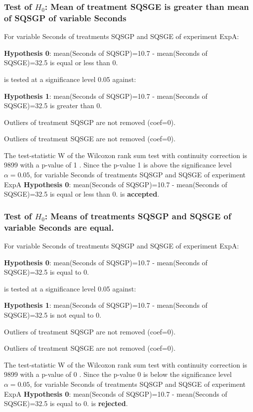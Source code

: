 \documentclass[18pt,c]{beamer}
\begin{document}
\begin{frame}[t]
 \frametitle{Test of $H_{0}$: Mean of treatment SQSGE is greater than mean of SQSGP of variable Seconds }
 \scriptsize
 For variable Seconds of treatments SQSGP and SQSGE of experiment ExpA:

\vspace{1mm}
{\bf Hypothesis 0}: mean(Seconds of SQSGP)=10.7 - mean(Seconds of SQSGE)=32.5 is equal or less than 0.


 \begin{center} is tested at a significance level 0.05 against: \end{center}

{\bf Hypothesis 1}: mean(Seconds of SQSGP)=10.7 - mean(Seconds of SQSGE)=32.5 is greater than 0.
\vspace{1mm}
\vspace{1mm}

 Outliers of treatment SQSGP  are not removed (coef=0).

 Outliers of treatment SQSGE  are not removed (coef=0).
\vspace{1mm}
 
 The test-statistic W of the Wilcoxon rank sum test with continuity correction is 9899 with a p-value of 1 .
 Since the p-value 1 is above the significance level $\alpha= 0.05 $,
 for variable Seconds of treatments SQSGP and SQSGE of experiment ExpA 
 {\bf Hypothesis 0}: mean(Seconds of SQSGP)=10.7 - mean(Seconds of SQSGE)=32.5 is equal or less than 0.
is {\bf accepted}.

 \end{frame}
\begin{frame}[t]
 \frametitle{Test of $H_{0}$: Means of treatments SQSGP and SQSGE of variable Seconds are equal. }
 \scriptsize
 For variable Seconds of treatments SQSGP and SQSGE of experiment ExpA:

\vspace{1mm}
{\bf Hypothesis 0}: mean(Seconds of SQSGP)=10.7 - mean(Seconds of SQSGE)=32.5 is equal to 0.


 \begin{center} is tested at a significance level 0.05 against: \end{center}

{\bf Hypothesis 1}: mean(Seconds of SQSGP)=10.7 - mean(Seconds of SQSGE)=32.5 is not equal to 0.
\vspace{1mm}
\vspace{1mm}

 Outliers of treatment SQSGP  are not removed (coef=0).

 Outliers of treatment SQSGE  are not removed (coef=0).
\vspace{1mm}
 
 The test-statistic W of the Wilcoxon rank sum test with continuity correction is 9899 with a p-value of 0 .
 Since the p-value 0 is below the significance level $\alpha= 0.05 $,
 for variable Seconds of treatments SQSGP and SQSGE of experiment ExpA 
 {\bf Hypothesis 0}: mean(Seconds of SQSGP)=10.7 - mean(Seconds of SQSGE)=32.5 is equal to 0.
is {\bf rejected}.

 \end{frame}
\end{document}
